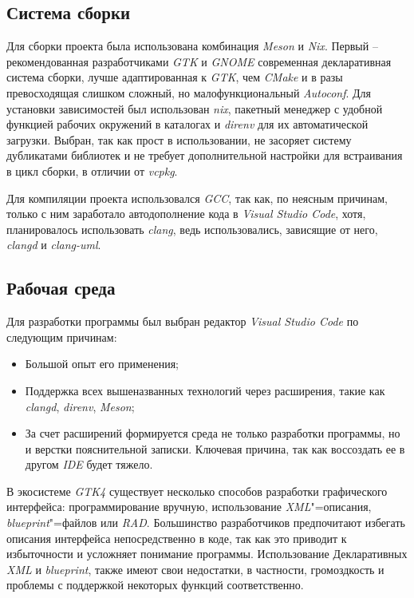 \documentclass[variant=courcework]{bsuir}
\begin{document}
\subsection{Система сборки}
Для сборки проекта была использована комбинация \textit{Meson} и \textit{Nix}.
Первый -- рекомендованная разработчиками \textit{GTK} и \textit{GNOME}
современная декларативная система сборки, лучше адаптированная к \textit{GTK},
чем \textit{CMake} и в разы превосходящая слишком сложный, но малофункциональный
\textit{Autoconf}. Для установки зависимостей был использован \textit{nix},
пакетный менеджер с удобной функцией рабочих окружений в каталогах и
\textit{direnv} для их автоматической загрузки. Выбран, так как прост в
использовании, не засоряет систему дубликатами библиотек и не требует
дополнительной настройки для встраивания в цикл сборки, в отличии от
\textit{vcpkg}.

Для компиляции проекта использовался \textit{GCC}, так как, по неясным причинам,
только с ним заработало автодополнение кода в \textit{Visual Studio Code}, хотя,
планировалось использовать \textit{clang}, ведь использовались, зависящие от
него, \textit{clangd} и \textit{clang-uml}.

\subsection{Рабочая среда}
Для разработки программы был выбран редактор \textit{Visual Studio Code} по
следующим причинам:

\begin{itemize}
    \item Большой опыт его применения;
    \item Поддержка всех вышеназванных технологий через расширения, такие как
          \textit{clangd}, \textit{direnv}, \textit{Meson};
    \item За счет расширений формируется среда не только разработки программы,
          но и верстки пояснительной записки. Ключевая причина, так как
          воссоздать ее в другом \textit{IDE} будет тяжело.
\end{itemize}

В экосистеме \textit{GTK4} существует несколько способов разработки графического
интерфейса: программирование вручную, использование \textit{XML}"=описания,
\textit{blueprint}"=файлов или \textit{RAD}. Большинство разработчиков
предпочитают избегать описания интерфейса непосредственно в коде, так как это
приводит к избыточности и усложняет понимание программы. Использование
Декларативных \textit{XML} и \textit{blueprint}, также имеют свои недостатки, в
частности, громоздкость и проблемы с поддержкой некоторых функций
соответственно.
\end{document}
